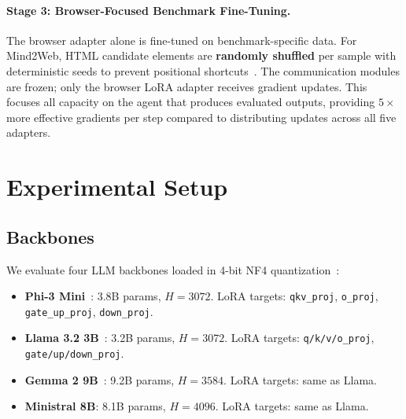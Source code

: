 \documentclass{article}
\begin{document}
\paragraph{Stage 3: Browser-Focused Benchmark Fine-Tuning.}
The browser adapter alone is fine-tuned on benchmark-specific data.  For Mind2Web, HTML candidate elements are \textbf{randomly shuffled} per sample with deterministic seeds to prevent positional shortcuts~\cite{deng2024mind2web}.  The communication modules are frozen; only the browser LoRA adapter receives gradient updates.  This focuses all capacity on the agent that produces evaluated outputs, providing $5\times$ more effective gradients per step compared to distributing updates across all five adapters.

\section{Experimental Setup}
\label{sec:setup}

\subsection{Backbones}

We evaluate four LLM backbones loaded in 4-bit NF4 quantization~\cite{dettmers2023qlora}:

\begin{itemize}[leftmargin=*,itemsep=1pt]
\item \textbf{Phi-3 Mini}~\cite{abdin2024phi3}: 3.8B params, $H{=}3072$.  LoRA targets: \texttt{qkv\_proj}, \texttt{o\_proj}, \texttt{gate\_up\_proj}, \texttt{down\_proj}.
\item \textbf{Llama 3.2 3B}~\cite{grattafiori2024llama3}: 3.2B params, $H{=}3072$.  LoRA targets: \texttt{q/k/v/o\_proj}, \texttt{gate/up/down\_proj}.
\item \textbf{Gemma 2 9B}~\cite{team2024gemma2}: 9.2B params, $H{=}3584$.  LoRA targets: same as Llama.
\item \textbf{Ministral 8B}: 8.1B params, $H{=}4096$.  LoRA targets: same as Llama.
\end{itemize}
\end{document}
